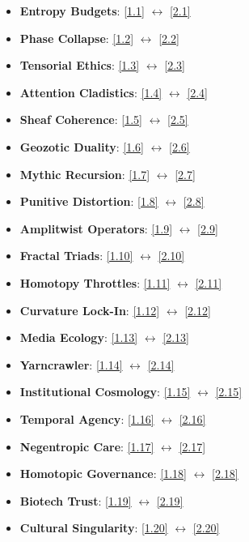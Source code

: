 \documentclass[12pt,a4paper]{article}
\newcommand{\essayref}[2]{\hyperref[sec:essay#1-#2]{[#1.#2]}}
\begin{document}
\begin{multicols}{2}
\begin{itemize}
\item \textbf{Entropy Budgets}: \essayref{1}{1} $\leftrightarrow$ \essayref{2}{1}
\item \textbf{Phase Collapse}: \essayref{1}{2} $\leftrightarrow$ \essayref{2}{2}
\item \textbf{Tensorial Ethics}: \essayref{1}{3} $\leftrightarrow$ \essayref{2}{3}
\item \textbf{Attention Cladistics}: \essayref{1}{4} $\leftrightarrow$ \essayref{2}{4}
\item \textbf{Sheaf Coherence}: \essayref{1}{5} $\leftrightarrow$ \essayref{2}{5}
\item \textbf{Geozotic Duality}: \essayref{1}{6} $\leftrightarrow$ \essayref{2}{6}
\item \textbf{Mythic Recursion}: \essayref{1}{7} $\leftrightarrow$ \essayref{2}{7}
\item \textbf{Punitive Distortion}: \essayref{1}{8} $\leftrightarrow$ \essayref{2}{8}
\item \textbf{Amplitwist Operators}: \essayref{1}{9} $\leftrightarrow$ \essayref{2}{9}
\item \textbf{Fractal Triads}: \essayref{1}{10} $\leftrightarrow$ \essayref{2}{10}
\item \textbf{Homotopy Throttles}: \essayref{1}{11} $\leftrightarrow$ \essayref{2}{11}
\item \textbf{Curvature Lock-In}: \essayref{1}{12} $\leftrightarrow$ \essayref{2}{12}
\item \textbf{Media Ecology}: \essayref{1}{13} $\leftrightarrow$ \essayref{2}{13}
\item \textbf{Yarncrawler}: \essayref{1}{14} $\leftrightarrow$ \essayref{2}{14}
\item \textbf{Institutional Cosmology}: \essayref{1}{15} $\leftrightarrow$ \essayref{2}{15}
\item \textbf{Temporal Agency}: \essayref{1}{16} $\leftrightarrow$ \essayref{2}{16}
\item \textbf{Negentropic Care}: \essayref{1}{17} $\leftrightarrow$ \essayref{2}{17}
\item \textbf{Homotopic Governance}: \essayref{1}{18} $\leftrightarrow$ \essayref{2}{18}
\item \textbf{Biotech Trust}: \essayref{1}{19} $\leftrightarrow$ \essayref{2}{19}
\item \textbf{Cultural Singularity}: \essayref{1}{20} $\leftrightarrow$ \essayref{2}{20}
\end{itemize}
\end{multicols}
\end{document}
